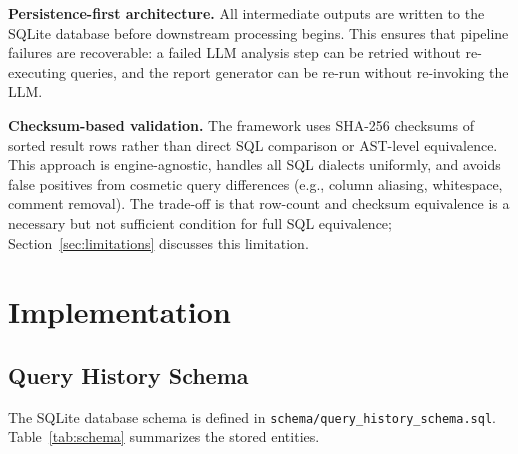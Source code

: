 \documentclass[conference]{IEEEtran}
\begin{document}
\textbf{Persistence-first architecture.} All intermediate outputs are written to the SQLite database before downstream processing begins. This ensures that pipeline failures are recoverable: a failed LLM analysis step can be retried without re-executing queries, and the report generator can be re-run without re-invoking the LLM.

\textbf{Checksum-based validation.} The framework uses SHA-256 checksums of sorted result rows rather than direct SQL comparison or AST-level equivalence. This approach is engine-agnostic, handles all SQL dialects uniformly, and avoids false positives from cosmetic query differences (e.g., column aliasing, whitespace, comment removal). The trade-off is that row-count and checksum equivalence is a necessary but not sufficient condition for full SQL equivalence; Section~\ref{sec:limitations} discusses this limitation.

\section{Implementation}
\subsection{Query History Schema}
The SQLite database schema is defined in \texttt{schema/query\_history\_schema.sql}. Table~\ref{tab:schema} summarizes the stored entities.

\begin{table}[t]
\caption{Query History Schema}
\label{tab:schema}
\centering
{}
\end{table}
\end{document}
